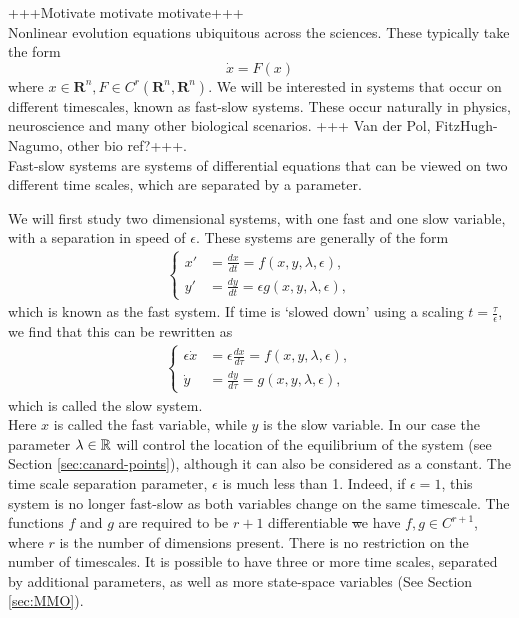 +++Motivate motivate motivate+++\\
Nonlinear evolution equations ubiquitous across the sciences. These typically take the form
$$ \dot{x} = F(x)$$ where $x\in \mathbf{R}^n, F\in C^r(\mathbf{R}^n,\mathbf{R}^n)$. We will be interested in systems that occur on different timescales, known as fast-slow systems. These occur naturally in physics, neuroscience and many other biological scenarios. +++ Van der Pol, FitzHugh-Nagumo, other bio ref?+++.\\
Fast-slow systems are systems of differential equations that can be viewed on two different time scales, which are separated by a parameter.

We will first study two dimensional systems, with one fast and one slow variable, with a separation in speed of $\epsilon$.
These systems are generally of the form
\begin{align}
\begin{cases}
x' &=\frac{dx}{dt}= f(x,y,\lambda, \epsilon),\\
y' &= \frac{dy}{dt}= \epsilon g( x,y, \lambda, \epsilon),
\end{cases}\label{FastS}
\end{align}
which is known as the fast system.
If time is `slowed down' using a scaling $t = \frac{\tau}{\epsilon} $, we find that this can be rewritten as
\begin{align}
\begin{cases}
\epsilon \dot{x} &= \epsilon \frac{dx}{d \tau} = f(x,y,\lambda, \epsilon),\\
\dot{y} & = \frac{dy}{d \tau} =  g( x,y, \lambda, \epsilon),
\end{cases}\label{SlowS}
\end{align}
which is called the slow system.\\

Here $x$ is called the fast variable, while $y$ is the slow variable. In our case the parameter $\lambda\in \mathbb{R} $ will control the location of the equilibrium of the system (see Section \ref{sec:canard-points}), although it can also be considered as a constant. The time scale separation parameter, $\epsilon$ is much less than 1. Indeed, if $\epsilon=1$, this system is no longer fast-slow as both variables change on the same timescale. The functions $f$ and $g$ are required to be $r+1$ differentiable \st we have $f,g \in  C^{r+1} $, where $ r $ is the number of dimensions present. There is no restriction on the number of timescales. It is possible to have three or more time scales, separated by additional parameters, as well as more state-space variables (See Section \ref{sec:MMO}). \\

